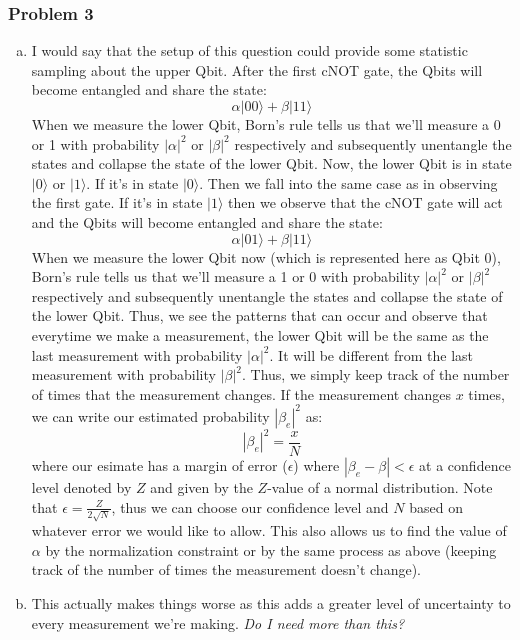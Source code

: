 \documentclass[a4paper,11pt]{article}
\begin{document}
\subsubsection*{Problem 3}
\begin{enumerate}[a)]
    \item I would say that the setup of this question could provide some statistic sampling about the upper Qbit. After the first cNOT gate, the Qbits will become entangled and share the state:
        $$\alpha|00\rangle + \beta|11\rangle$$
        When we measure the lower Qbit, Born's rule tells us that we'll measure a 0 or 1 with probability $|\alpha|^2$ or $|\beta|^2$ respectively and subsequently unentangle the states and collapse the state of the lower Qbit. Now, the lower Qbit is in state $|0\rangle$ or $|1\rangle$. If it's in state $|0\rangle$. Then we fall into the same case as in observing the first gate. If it's in state $|1\rangle$ then we observe that the cNOT gate will act and the Qbits will become entangled and share the state:
        $$\alpha|01\rangle + \beta|11\rangle$$
        When we measure the lower Qbit now (which is represented here as Qbit 0), Born's rule tells us that we'll measure a 1 or 0 with probability $|\alpha|^2$ or $|\beta|^2$ respectively and subsequently unentangle the states and collapse the state of the lower Qbit. Thus, we see the patterns that can occur and observe that everytime we make a measurement, the lower Qbit will be the same as the last measurement with probability $|\alpha|^2$. It will be different from the last measurement with probability $|\beta|^2$. Thus, we simply keep track of the number of times that the measurement changes. If the measurement changes $x$ times, we can write our estimated probability $|\beta_e|^2$ as:
        $$|\beta_e|^2=\frac{x}{N}$$
        where our esimate has a margin of error ($\epsilon$) where $|\beta_e-\beta|<\epsilon$ at a confidence level denoted by $Z$ and given by the $Z$-value of a normal distribution. Note that $\epsilon=\frac{Z}{2\sqrt{N}}$, thus we can choose our confidence level and $N$ based on whatever error we would like to allow. This also allows us to find the value of $\alpha$ by the normalization constraint or by the same process as above (keeping track of the number of times the measurement doesn't change).
    \item This actually makes things worse as this adds a greater level of uncertainty to every measurement we're making.
\emph{\color{red} Do I need more than this?}
\end{enumerate}
\end{document}
